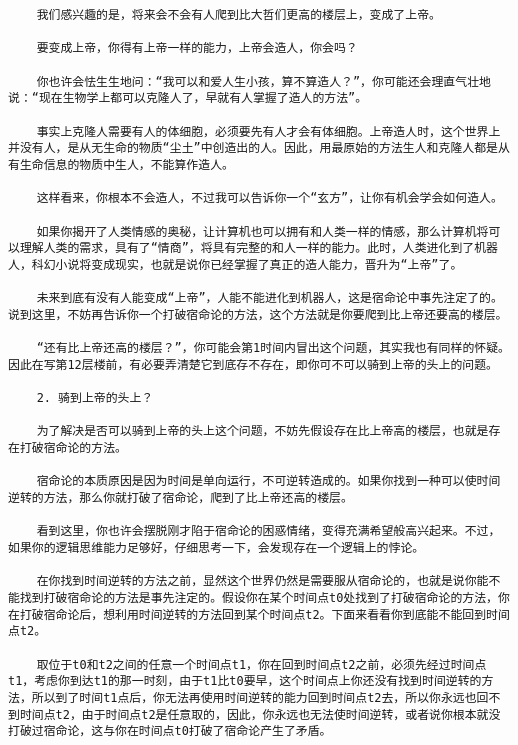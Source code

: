 \begin{verbatim}
    我们感兴趣的是，将来会不会有人爬到比大哲们更高的楼层上，变成了上帝。

    要变成上帝，你得有上帝一样的能力，上帝会造人，你会吗？

    你也许会怯生生地问：“我可以和爱人生小孩，算不算造人？”，你可能还会理直气壮地说：“现在生物学上都可以克隆人了，早就有人掌握了造人的方法”。

    事实上克隆人需要有人的体细胞，必须要先有人才会有体细胞。上帝造人时，这个世界上并没有人，是从无生命的物质“尘土”中创造出的人。因此，用最原始的方法生人和克隆人都是从有生命信息的物质中生人，不能算作造人。

    这样看来，你根本不会造人，不过我可以告诉你一个“玄方”，让你有机会学会如何造人。

    如果你揭开了人类情感的奥秘，让计算机也可以拥有和人类一样的情感，那么计算机将可以理解人类的需求，具有了“情商”，将具有完整的和人一样的能力。此时，人类进化到了机器人，科幻小说将变成现实，也就是说你已经掌握了真正的造人能力，晋升为“上帝”了。

    未来到底有没有人能变成“上帝”，人能不能进化到机器人，这是宿命论中事先注定了的。说到这里，不妨再告诉你一个打破宿命论的方法，这个方法就是你要爬到比上帝还要高的楼层。

    “还有比上帝还高的楼层？”，你可能会第1时间内冒出这个问题，其实我也有同样的怀疑。因此在写第12层楼前，有必要弄清楚它到底存不存在，即你可不可以骑到上帝的头上的问题。

    2. 骑到上帝的头上？

    为了解决是否可以骑到上帝的头上这个问题，不妨先假设存在比上帝高的楼层，也就是存在打破宿命论的方法。

    宿命论的本质原因是因为时间是单向运行，不可逆转造成的。如果你找到一种可以使时间逆转的方法，那么你就打破了宿命论，爬到了比上帝还高的楼层。

    看到这里，你也许会摆脱刚才陷于宿命论的困惑情绪，变得充满希望般高兴起来。不过，如果你的逻辑思维能力足够好，仔细思考一下，会发现存在一个逻辑上的悖论。

    在你找到时间逆转的方法之前，显然这个世界仍然是需要服从宿命论的，也就是说你能不能找到打破宿命论的方法是事先注定的。假设你在某个时间点t0处找到了打破宿命论的方法，你在打破宿命论后，想利用时间逆转的方法回到某个时间点t2。下面来看看你到底能不能回到时间点t2。

    取位于t0和t2之间的任意一个时间点t1，你在回到时间点t2之前，必须先经过时间点t1，考虑你到达t1的那一时刻，由于t1比t0要早，这个时间点上你还没有找到时间逆转的方法，所以到了时间t1点后，你无法再使用时间逆转的能力回到时间点t2去，所以你永远也回不到时间点t2，由于时间点t2是任意取的，因此，你永远也无法使时间逆转，或者说你根本就没打破过宿命论，这与你在时间点t0打破了宿命论产生了矛盾。


\end{verbatim}
